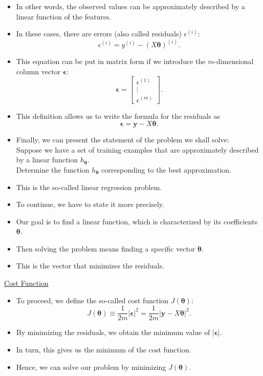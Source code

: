 \documentclass[10pt,american]{scrartcl}
\begin{document}
\begin{itemize}
\item In other words, the observed values can be approximately described
by a linear function of the features.
\item In these cases, there are errors (also called residuals) $\epsilon^{\left(i\right)}$:
\[
\epsilon^{\left(i\right)}=y^{\left(i\right)}-\left(X\boldsymbol{\theta}\right)^{\left(i\right)}.
\]
\item This equation can be put in matrix form if we introduce the $m$-dimensional
column vector $\boldsymbol{\epsilon}$:
\[
\boldsymbol{\epsilon}=\begin{bmatrix}\epsilon^{\left(1\right)}\\
\vdots\\
\epsilon^{\left(m\right)}
\end{bmatrix}.
\]
\item This definition allows us to write the formula for the residuals as
\[
\boldsymbol{\epsilon}=\mathbf{y}-X\boldsymbol{\theta}.
\]
\item Finally, we can present the statement of the problem we shall solve:\\Suppose
we have a set of training examples that are approximately described
by a linear function $h_{\boldsymbol{\theta}}$.\\Determine the function
$h_{\boldsymbol{\theta}}$ corresponding to the best approximation.
\item This is the so-called linear regression problem.
\item To continue, we have to state it more precisely.
\item Our goal is to find a linear function, which is characterized by its
coefficients $\boldsymbol{\theta}$.
\item Then solving the problem means finding a specific vector $\boldsymbol{\theta}$.
\item This is the vector that minimizes the residuals.
\end{itemize}
\uline{Cost Function}
\begin{itemize}
\item To proceed, we define the so-called cost function $J\left(\boldsymbol{\theta}\right)$:
\[
J\left(\boldsymbol{\theta}\right)\equiv\frac{1}{2m}\left|\boldsymbol{\epsilon}\right|^{2}=\frac{1}{2m}\left|\mathbf{y}-X\boldsymbol{\theta}\right|^{2}.
\]
\item By minimizing the residuals, we obtain the minimum value of $\left|\boldsymbol{\epsilon}\right|$.
\item In turn, this gives us the minimum of the cost function.
\item Hence, we can solve our problem by minimizing $J\left(\boldsymbol{\theta}\right)$.
\end{itemize}
\end{document}
